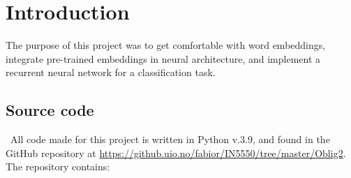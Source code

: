 \section{Introduction}
\label{chap:Introduction}

\quad The purpose of this project was to get comfortable with word embeddings, integrate pre-trained embeddings in neural architecture, and implement a recurrent neural network for a classification task.


\subsection{Source code}
\label{chap:Source code}

\quad \, All code made for this project is written in Python v.3.9, and found in the GitHub repository at \href{https://github.uio.no/fabior/IN5550/tree/master/Oblig2}{https://github.uio.no/fabior/IN5550/tree/master/Oblig2}. The repository contains:

